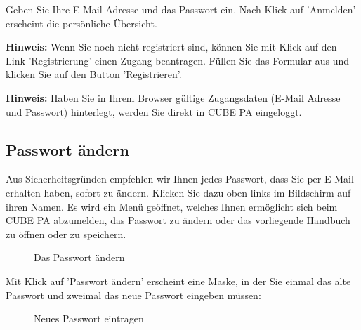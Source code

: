 Geben Sie Ihre E-Mail Adresse und das Passwort ein. Nach Klick auf 'Anmelden' erscheint die persönliche Übersicht.

\vspace{\baselineskip}

\textbf{Hinweis:} Wenn Sie noch nicht registriert sind, können Sie mit Klick auf den Link 'Registrierung' einen Zugang beantragen. Füllen Sie das Formular aus und klicken Sie auf den Button 'Registrieren'.

\vspace{\baselineskip}

\textbf{Hinweis:} Haben Sie in Ihrem Browser gültige Zugangsdaten (E-Mail Adresse und Passwort) hinterlegt, werden Sie direkt in CUBE PA eingeloggt.

\subsection{Passwort ändern}
\label{bkm:Ref434828103}

Aus Sicherheitsgründen empfehlen wir Ihnen jedes Passwort, dass Sie per E-Mail erhalten haben, sofort zu ändern. Klicken Sie dazu oben links im Bildschirm auf ihren Namen. Es wird ein Menü geöffnet, welches Ihnen ermöglicht sich beim CUBE PA abzumelden, das Passwort zu ändern oder das vorliegende Handbuch zu öffnen oder zu speichern.

\begin{figure}[H]
\caption{Das Passwort ändern}
\end{figure}

Mit Klick auf 'Passwort ändern' erscheint eine Maske, in der Sie einmal das alte Passwort und zweimal das neue Passwort eingeben müssen:

\begin{figure}[H]
\caption{Neues Passwort eintragen}
\end{figure}


